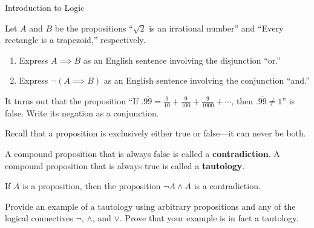 \begin{section}{Introduction to Logic}
\begin{problem}\label{prob:Darth Vader}
Let $A$ and $B$ be the propositions ``$\sqrt{2}$ is an irrational number'' and ``Every rectangle is a trapezoid,'' respectively.
\begin{enumerate}[label=\textrm{(\alph*)}]
\item Express $A\implies B$ as an English sentence involving the disjunction ``or.''
\item Express $\neg(A\implies B)$ as an English sentence involving the conjunction ``and.''
\end{enumerate}
\end{problem}

\begin{problem}
It turns out that the proposition ``If $.\overline{99}=\frac{9}{10}+\frac{9}{100}+\frac{9}{1000}+\cdots$, then $.\overline{99}\neq 1$'' is false. Write its  negation as a conjunction.
\end{problem}

Recall that a proposition is exclusively either true or false---it can never be both.

\begin{definition}
A compound proposition that is always false is called a \textbf{contradiction}.  A compound proposition that is always true is called a \textbf{tautology}.
\end{definition}

\begin{theorem}
If $A$ is a proposition, then the proposition $\neg A\wedge A$ is a contradiction.
\end{theorem}

\begin{problem}
Provide an example of a tautology using arbitrary propositions and any of the logical connectives $\neg$, $\wedge$, and $\vee$.  Prove that your example is in fact a tautology.
\end{problem}





\end{section}
